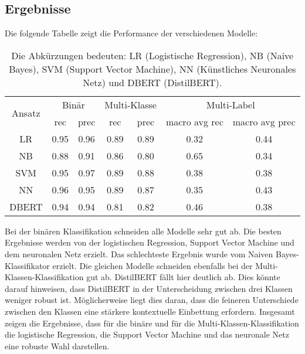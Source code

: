 \subsection{Ergebnisse}
Die folgende Tabelle zeigt die Performance der verschiedenen Modelle:
\begin{table}[h]
    \centering
    \begin{tabular}{|c|c|c|c|c|c|c|}
        \hline
        \multirow{2}{*}{Ansatz} & \multicolumn{2}{c|}{Binär} & \multicolumn{2}{c|}{Multi-Klasse} & \multicolumn{2}{c|}{Multi-Label}                                         \\
        \cline{2-7}
                                & rec                        & prec                              & rec                              & prec & macro avg rec & macro avg prec \\
        \hline
        LR                      & 0.95                       & 0.96                              & 0.89                             & 0.89 & 0.32          & 0.44           \\
        \hline
        NB                      & 0.88                       & 0.91                              & 0.86                             & 0.80 & 0.65          & 0.34           \\
        \hline
        SVM                     & 0.95                       & 0.97                              & 0.89                             & 0.88 & 0.38          & 0.38           \\
        \hline
        NN                      & 0.96                       & 0.95                              & 0.89                             & 0.87 & 0.35          & 0.43           \\
        \hline
        DBERT                   & 0.94                       & 0.94                              & 0.81                             & 0.82 & 0.46          & 0.38           \\
        \hline
    \end{tabular}
    \caption{Die Abkürzungen bedeuten: LR (Logistische Regression), NB (Naive Bayes), SVM (Support Vector Machine), NN (Künstliches Neuronales Netz) und DBERT (DistilBERT).}
\end{table}

Bei der binären Klassifikation schneiden alle Modelle sehr gut ab. Die besten Ergebnisse werden von der logistischen Regression, Support Vector Machine und dem neuronalen Netz erzielt. Das schlechteste Ergebnis wurde vom Naiven Bayes-Klassifikator erzielt. Die gleichen Modelle schneiden ebenfalls bei der Multi-Klassen-Klassifikation gut ab. DistilBERT fällt hier deutlich ab. Dies könnte darauf hinweisen, dass DistilBERT in der Unterscheidung zwischen drei Klassen weniger robust ist. Möglicherweise liegt dies daran, dass die feineren Unterschiede zwischen den Klassen eine stärkere kontextuelle Einbettung erfordern. Insgesamt zeigen die Ergebnisse, dass für die binäre und für die Multi-Klassen-Klassifikation die logistische Regression, die Support Vector Machine und das neuronale Netz eine robuste Wahl darstellen.

